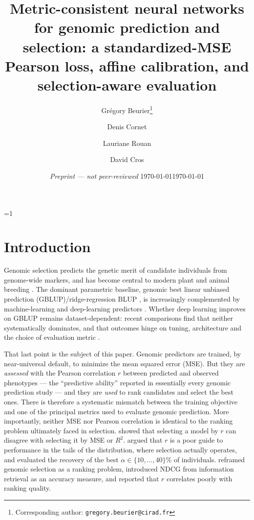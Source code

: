 \documentclass[11pt]{article}
\title{\bfseries Metric-consistent neural networks for genomic prediction and
selection: a standardized-MSE Pearson loss, affine calibration, and
selection-aware evaluation}
\author[1,2]{Gr\'egory Beurier\thanks{Corresponding author: \texttt{gregory.beurier@cirad.fr}}}
\author[1,2]{Denis Cornet}
\author[1,2]{Lauriane Rouan}
\author[1,2]{David Cros}
\affil[1]{CIRAD, UMR AGAP Institut, Montpellier, France}
\affil[2]{UMR AGAP Institut, Univ Montpellier, CIRAD, INRAE, Institut Agro, Montpellier, France}
\date{\ifnum\PREPRINTMODE=1 \textit{Preprint --- not peer-reviewed} \quad\textbullet\quad \today\else\today\fi}
\providecommand{\PREPRINTMODE}{0}
\theoremstyle{plain}
\theoremstyle{remark}
\begin{document}
\maketitle
\ifnum\PREPRINTMODE=1 \linenumbers \fi

\begin{abstract}
\noindent

\end{abstract}

\section{Introduction}

Genomic selection \citep{meuwissen2001} predicts the genetic merit of candidate
individuals from genome-wide markers, and has become central to modern plant and
animal breeding \citep{heffner2009,jannink2010,desta2014}. The dominant
parametric baseline, genomic best linear unbiased prediction
(GBLUP)/ridge-regression BLUP \citep{vanraden2008,endelman2011}, is increasingly
complemented by machine-learning and deep-learning predictors
\citep{ma2018deepgs,wang2023dnngp,montesinos2021review,montesinos2021power}.
Whether deep learning improves on GBLUP remains dataset-dependent: recent
comparisons find that neither systematically dominates, and that outcomes hinge
on tuning, architecture and the choice of evaluation metric
\citep{montesinos2025dlgblup}.

That last point is the subject of this paper. Genomic predictors are trained, by
near-universal default, to minimize the mean squared error (MSE). But they are
\emph{assessed} with the Pearson correlation $r$ between predicted and observed
phenotypes --- the ``predictive ability'' reported in essentially every genomic
prediction study \citep{crossa2010} --- and they are \emph{used} to rank
candidates and select the best ones. There is therefore a systematic mismatch
between the training objective and one of the principal metrics used to evaluate
genomic prediction. More importantly, neither MSE nor Pearson correlation is
identical to the ranking problem ultimately faced in selection.
\citet{waldmann2019} showed that selecting a model by $r$ can disagree with
selecting it by MSE or $R^2$. \citet{ornella2014} argued that $r$ is a poor guide
to performance in the tails of the distribution, where selection actually
operates, and evaluated the recovery of the best $\alpha\in\{10,\dots,40\}\%$ of
individuals. \citet{blondel2015} reframed genomic selection as a ranking problem,
introduced NDCG from information retrieval as an accuracy measure, and reported
that $r$ correlates poorly with ranking quality.
\end{document}
